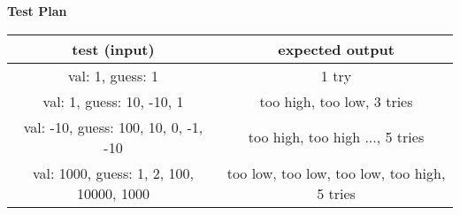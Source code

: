 \documentclass[a4paper, 11pt]{article}
\begin{document}
	\textbf{Test Plan} 
	\begin{center}
		\begin{tabular}{|c|c|}
			\hline
			\textbf{test (input)} & \textbf{expected output} \\ 
			\hline 
			val: 1, guess: 1 & 1 try \\ 
			\hline 
			val: 1, guess: 10, -10, 1 & too high, too low, 3 tries \\
			\hline 
			val: -10, guess: 100, 10, 0, -1, -10 & too high, too high ..., 5 tries \\ 
			\hline 
			val: 1000, guess: 1, 2, 100, 10000, 1000 & too low, too low, too low, too high, 5 tries \\ 
			\hline 
		\end{tabular}
	\end{center}
	
\end{document}
